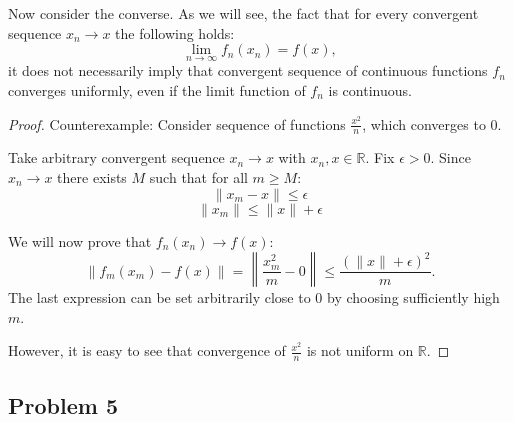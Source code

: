 \documentclass{article}
\begin{document}
Now consider the converse. As we will see, the fact that for every convergent sequence $x_n \to x$ the following holds:
$$ \lim_{n \to \infty} f_n(x_n) = f(x), $$
it does not necessarily imply that convergent sequence of continuous functions $f_n$ converges uniformly, even if the limit function of $f_n$ is continuous.

\begin{proof}
Counterexample: Consider sequence of functions $\frac{x^2}{n}$, which converges to $0$.

Take arbitrary convergent sequence $x_n \to x$ with $x_n,x \in \mathbb{R}$. Fix $\epsilon>0$. Since $x_n \to x$ there exists $M$ such that for all $m \geq M$:
$$ \lVert x_m - x \rVert \leq \epsilon $$
$$ \lVert x_m \rVert \leq \lVert x \rVert + \epsilon $$

We will now prove that $f_n(x_n) \to f(x)$:
$$ \lVert f_m(x_m) - f(x) \rVert = \left\lVert \frac{x_m^2}{m} - 0 \right\rVert \leq \frac{(\lVert x \rVert + \epsilon)^2}{m}. $$
The last expression can be set arbitrarily close to $0$ by choosing sufficiently high $m$.

However, it is easy to see that convergence of $\frac{x^2}{n}$ is not uniform on $\mathbb{R}$.
\end{proof}


\subsection*{Problem 5}
\end{document}
